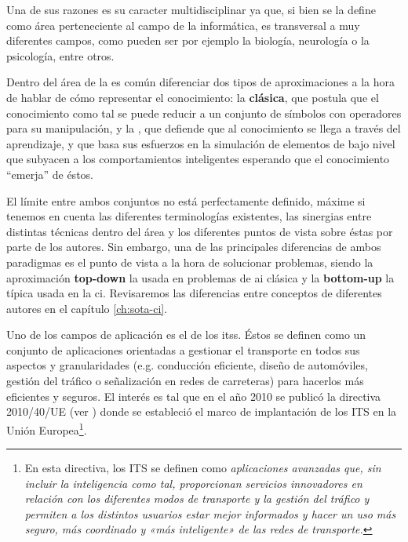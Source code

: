 Una de sus razones es su caracter multidisciplinar ya que, si bien se la define como área perteneciente al campo de la informática, es transversal a muy diferentes campos, como pueden ser por ejemplo la biología, neurología o la psicología, entre otros.

Dentro del área de la  es común diferenciar dos tipos de aproximaciones a la hora de hablar de cómo representar el conocimiento: la \textbf{ clásica}, que postula que el conocimiento como tal se puede reducir a un conjunto de símbolos con operadores para su manipulación, y la \textbf{}, que defiende que al conocimiento se llega a través del aprendizaje, y que basa sus esfuerzos en la simulación de elementos de bajo nivel que subyacen a los comportamientos inteligentes esperando que el conocimiento \enquote{emerja} de éstos.

El límite entre ambos conjuntos no está perfectamente definido, máxime si tenemos en cuenta las diferentes terminologías existentes, las sinergias entre distintas técnicas dentro del área y los diferentes puntos de vista sobre éstas por parte de los autores. Sin embargo, una de las principales diferencias de ambos paradigmas es el punto de vista a la hora de solucionar problemas, siendo la aproximación \textbf{top-down} la usada en problemas de \acrshort{ai} clásica y la \textbf{bottom-up} la típica usada en la \acrshort{ci}. Revisaremos las diferencias entre conceptos de diferentes autores en el capítulo \ref{ch:sota-ci}.

Uno de los campos de aplicación es el de los \acp{its}. Éstos se definen como un conjunto de aplicaciones orientadas a gestionar el transporte en todos sus aspectos y granularidades (e.g. conducción eficiente, diseño de automóviles, gestión del tráfico o señalización en redes de carreteras) para hacerlos más eficientes y seguros. El interés es tal que en el año 2010 se publicó la directiva 2010/40/UE (ver \cite{parliament2010directive}) donde se estableció el marco de implantación de los ITS en la Unión Europea\footnote{En esta directiva, los ITS se definen como \textit{aplicaciones avanzadas que, sin incluir la inteligencia como tal, proporcionan servicios innovadores en relación con los diferentes modos de transporte y la gestión del tráfico y permiten a los distintos usuarios estar mejor informados y hacer un uso más seguro, más coordinado y «más inteligente» de las redes de transporte.}}.

